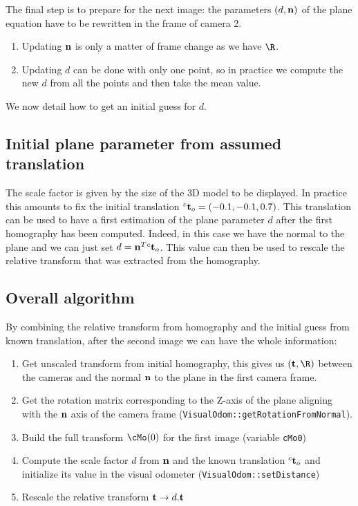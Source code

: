\documentclass{ecnreport}
\begin{document}
The final step is to prepare for the next image: the parameters $(d,\mathbf{n})$ of the plane equation have to be rewritten in the frame of camera 2.
\begin{enumerate}
 \item Updating $\mathbf{n}$ is only a matter of frame change as we have $\R$.
 \item Updating $d$ can be done with only one point, so in practice we compute the new $d$ from all the points and then take the mean value.
\end{enumerate}
We now detail how to get an initial guess for $d$.


\subsection{Initial plane parameter from assumed translation}
\label{sec:init}

The scale factor is given by the size of the 3D model to be displayed. In practice this amounts to fix the initial translation ${}^c\mathbf{t}_o = (-0.1,-0.1,0.7)$.
This translation can be used to have a first estimation of the plane parameter $d$ after the first homography has been computed.
Indeed, in this case we have the normal to the plane and we can just set $d = \mathbf{n}^T{}^c\mathbf{t}_o$. This value can then be used to rescale the relative transform 
that was extracted from the homography. 

\subsection{Overall algorithm}

By combining the relative transform from homography and the initial guess from known translation, after the second image we can have the whole information:
\begin{enumerate}
 \item Get unscaled transform from initial homography, this gives us $(\t,\R)$ between the cameras and the normal $\mathbf{n}$ to the plane in the first camera frame.
 \item Get the rotation matrix corresponding to the Z-axis of the plane aligning with the $\mathbf{n}$ axis of the camera frame (\texttt{VisualOdom::getRotationFromNormal}). 
 \item Build the full transform $\cMo(0)$ for the first image (variable \texttt{cMo0})
  \item Compute the scale factor $d$ from $\mathbf{n}$ and the known translation ${}^c\mathbf{t}_o$ and initialize its value in the visual odometer (\texttt{VisualOdom::setDistance})
  \item Rescale the relative transform $\mathbf{t} \rightarrow d.\mathbf{t}$
\end{enumerate}
\end{document}
